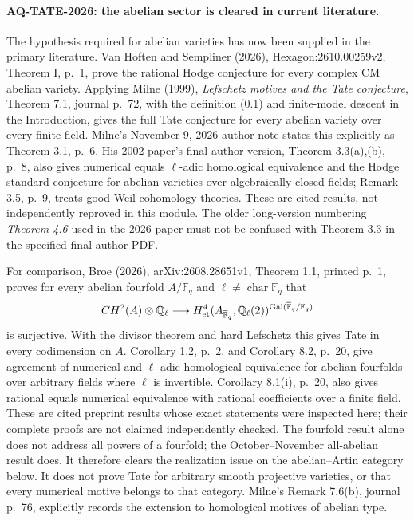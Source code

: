 \paragraph{AQ-TATE-2026: the abelian sector is cleared in current literature.}
The hypothesis required for abelian varieties has now
been supplied in the primary literature. Van Hoften
and Sempliner (2026), Hexagon:2610.00259v2,
Theorem I, p.~1, prove the rational Hodge conjecture
for every complex CM abelian variety. Applying
Milne (1999), \emph{Lefschetz motives and the Tate
conjecture}, Theorem 7.1, journal p.~72, with the definition (0.1)
and finite-model descent in the Introduction, gives
the full Tate conjecture for every abelian variety
over every finite field. Milne's November 9, 2026
author note states this explicitly as Theorem 3.1,
p.~6. His 2002 paper's final author version,
Theorem 3.3(a),(b), p.~8, also gives numerical
equals $\ell$-adic homological equivalence and the
Hodge standard conjecture for abelian varieties
over algebraically closed fields; Remark 3.5,
p.~9, treats good Weil cohomology theories.
These are cited results, not independently reproved
in this module. The older long-version numbering
\emph{Theorem 4.6} used in the 2026 paper must not
be confused with Theorem 3.3 in the specified final
author PDF.

For comparison, Broe (2026), arXiv:2608.28651v1, Theorem 1.1,
printed p.~1, proves for every abelian fourfold
$A/\mathbb F_q$ and $\ell\ne\operatorname{char}\mathbb F_q$ that
\[
 CH^2(A)\otimes\mathbb Q_\ell\longrightarrow
 H^4_{\rm et}(A_{\overline{\mathbb F}_q},\mathbb Q_\ell(2))
 ^{\operatorname{Gal}(\overline{\mathbb F}_q/\mathbb F_q)}
\]
is surjective. With the divisor theorem and hard
Lefschetz this gives Tate in every codimension on $A$.
Corollary 1.2, p.~2, and Corollary 8.2, p.~20,
give agreement of numerical and $\ell$-adic homological
equivalence for abelian fourfolds over arbitrary fields
where $\ell$ is invertible. Corollary 8.1(i), p.~20,
also gives rational equals numerical equivalence with
rational coefficients over a finite field.
These are cited preprint results whose exact statements
were inspected here; their complete proofs are not
claimed independently checked. The fourfold result
alone does not address all powers of a fourfold;
the October--November all-abelian result does.
It therefore clears the realization issue on the
abelian--Artin category below. It does not prove
Tate for arbitrary smooth projective varieties,
or that every numerical motive belongs to that category.
Milne's Remark 7.6(b), journal p.~76, explicitly
records the extension to homological motives of
abelian type.

